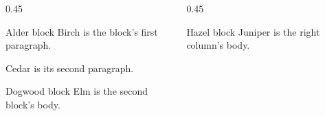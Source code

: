 \documentclass{poster}
\begin{document}
\begin{frame}[t]
\begin{columns}[T]
\begin{column}{0.45\textwidth}
\begin{block}{Alder block}
Birch is the block's first paragraph.

Cedar is its second paragraph.
\end{block}
\begin{block}{Dogwood block}
Elm is the second block's body.
\end{block}
\end{column}
\begin{column}{0.45\textwidth}
\begin{block}{Hazel block}
Juniper is the right column's body.
\end{block}
\end{column}
\end{columns}
\end{frame}
\end{document}
